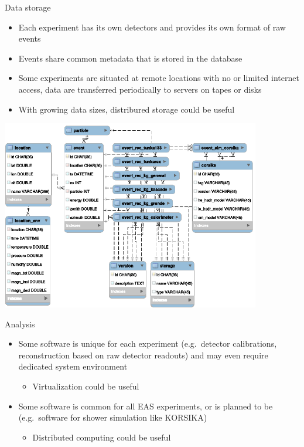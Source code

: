 \documentclass[18pt]{beamer}
\begin{document}
\begin{frame}[allowframebreaks]{Data storage}
\begin{itemize}
  \item Each experiment has its own detectors and provides its own format of raw events
  \item Events share common metadata that is stored in the database
  \item Some experiments are situated at remote locations with no or limited internet access, data are transferred periodically to servers on tapes or disks
  \item With growing data sizes, distribured storage could be useful
\end{itemize}
\begin{center}
\includegraphics[width=0.85\textwidth]{metadata.eps}
\end{center}
\end{frame}

\begin{frame}{Analysis}
\begin{itemize}
  \item Some software is unique for each experiment (e.g.\ detector calibrations, reconstruction based on raw detector readouts) and may even require dedicated system environment
  \begin{itemize}
    \item Virtualization could be useful
  \end{itemize}
  \item Some software is common for all EAS experiments, or is planned to be (e.g.\ software for shower simulation like KORSIKA)
  \begin{itemize}
    \item Distributed computing could be useful
  \end{itemize}
\end{itemize}
\end{frame}
\end{document}
